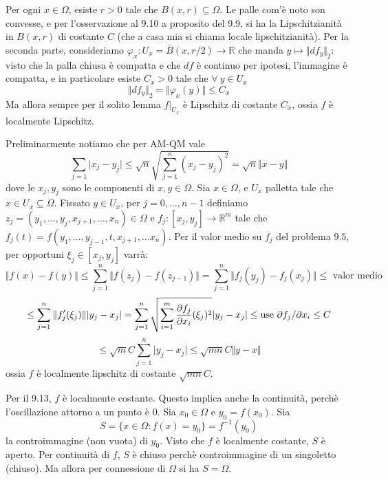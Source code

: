  Per ogni $ x \in \Omega$, esiste $r>0$ tale che $B(x,r) \subseteq \Omega$. Le palle com'è noto son convesse, e per l'osservazione al 9.10 a proposito del 9.9, si ha la Lipschitzianità in $B(x,r)$ di costante $C$ (che a casa mia si chiama locale lipschitzianità). Per la seconda parte, consideriamo $ \varphi_x: U_x = \bar{B}(x, r/2) \rightarrow \mathbb{R}$ che manda $y \mapsto \Vert df_y \Vert_2 $: visto che la palla chiusa è compatta e che $df$ è continuo per ipotesi, l'immagine è compatta, e in particolare esiste $C_x > 0$ tale che $\forall \ y \in U_x $
$$ \Vert df_y \Vert_2 = \Vert \varphi_x(y) \Vert  \le C_x $$
Ma allora sempre per il solito lemma $f|_{U_x}$ è Lipschitz di costante $C_x$, ossia $f$ è localmente Lipschitz.

 Preliminarmente notiamo che per AM-QM vale 
$$ \sum_{j=1} \vert x_j - y_j \vert \le \sqrt{n} \sqrt { \sum_{j=1}^n (x_j - y_j)^2  } = \sqrt{n} \Vert x-y \Vert $$
dove le $x_j, y_j$ sono le componenti di $x,y \in \Omega$. Sia $x \in \Omega$, e $U_x$ palletta tale che $x \in U_x \subseteq \Omega$. Fissato $y \in U_x$, per $j=0, \ldots, n-1$ definiamo $z_j = ( y_1, \ldots, y_j, x_{j+1}, \ldots, x_n ) \in \Omega $ e $f_j : [x_j, y_j] \rightarrow \mathbb{R}^m$ tale che $f_j(t) = f(y_1, \ldots, y_{j-1}, t, x_{j+1}, \ldots x_n ) $. Per il valor medio su $f_j$ del problema $9.5$, per opportuni $\xi_j \in [x_j, y_j] $ varrà:
$$ \Vert f(x) - f(y) \Vert \le \sum_{j=1} ^n \Vert f(z_j) - f(z_{j-1}) \Vert = \sum_{j=1}^n \Vert f_j(y_j) - f_j(x_j) \Vert \le \mbox{ valor medio } $$
$$ \le \sum_{j=1}^n \Vert f_j'(\xi_j) \Vert \vert y_j - x_j \vert = \sum_{j=1}^n \sqrt{ \sum_{i=1}^m \frac{ \partial f_j}{\partial x_i} (\xi_j) ^2 } \vert  y_j - x_j \vert \le \mbox{ \\ use } \partial f_j / \partial x_i \le C $$
$$ \le \sqrt{m} C \sum_{j=1}^n \vert y_j - x_j \vert \le \sqrt{mn} C \Vert y-x \Vert $$
ossia $f$ è localmente lipschitz di costante $\sqrt{mn} C$.

 Per il 9.13, $f$ è localmente costante. Questo implica anche la continuità, perchè l'oscillazione attorno a un punto è 0. Sia $x_0 \in \Omega $ e $y_0 = f(x_0)$. Sia
$$ S = \{x \in \Omega: f(x) = y_0 \} = f^{-1}(y_0) $$
la controimmagine (non vuota) di $y_0$. \newline
Visto che $f$ è localmente costante, $S$ è aperto. Per continuità di $f$, $S$ è chiuso perchè controimmagine di un singoletto (chiuso). Ma allora per connessione di $\Omega$ si ha $S= \Omega$. 

